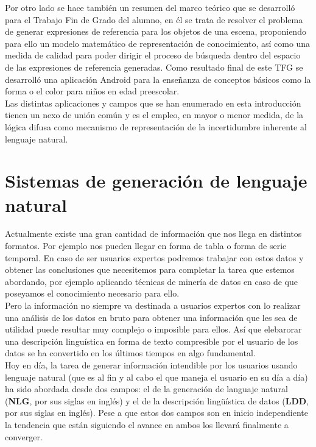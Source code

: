 \documentclass[10pt,a4paper]{article}
\begin{document}
Por otro lado se hace también un resumen del marco teórico que se desarrolló para el Trabajo Fin de Grado del alumno, en él se trata de resolver el problema de generar expresiones de referencia para los objetos de una escena, proponiendo para ello un modelo matemático de representación de conocimiento, así como una medida de calidad para poder dirigir el proceso de búsqueda dentro del espacio de las expresiones de referencia generadas. Como resultado final de este TFG se desarrolló una aplicación Android para la enseñanza de conceptos básicos como la forma o el color para niños en edad preescolar.\\

Las distintas aplicaciones y campos que se han enumerado en esta introducción tienen un nexo de unión común y es el empleo, en mayor o menor medida, de la lógica difusa como mecanismo de representación de la incertidumbre inherente al lenguaje natural.

\section{Sistemas de generación de lenguaje natural}

Actualmente existe una gran cantidad de información que nos llega en distintos formatos. Por ejemplo nos pueden llegar en forma de tabla o forma de serie temporal. En caso de ser usuarios expertos podremos trabajar con estos datos y obtener las conclusiones que necesitemos para completar la tarea que estemos abordando, por ejemplo aplicando técnicas de minería de datos en caso de que poseyamos el conocimiento necesario para ello.\\

Pero la información no siempre va destinada a usuarios expertos con lo realizar una análisis de los datos en bruto para obtener una información que les sea de utilidad puede resultar muy complejo o imposible para ellos. Así que elebarorar una descripción linguística en forma de texto compresible por el usuario de los datos se ha convertido en los últimos tiempos en algo fundamental.\\

Hoy en día, la tarea de generar información intendible por los usuarios usando lenguaje natural (que es al fin y al cabo el que maneja el usuario en su día a día) ha sido abordada desde dos campos: el de la generación de languaje natural (\textbf{NLG}, por sus siglas en inglés) y el de la descripción lingüística de datos (\textbf{LDD}, por sus siglas en inglés). Pese a que estos dos campos son en inicio independiente la tendencia que están siguiendo el avance en ambos los llevará finalmente a converger.\\
\end{document}
